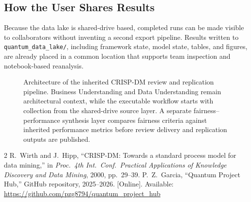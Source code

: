 \documentclass{IEEEtran}
\begin{document}
\subsection{How the User Shares Results}
Because the data lake is shared-drive based, completed runs can be made visible
to collaborators without inventing a second export pipeline. Results written to
\texttt{quantum\_data\_lake/}, including framework state, model state, tables,
and figures, are already placed in a common location that supports team
inspection and notebook-based reanalysis.

\clearpage
\begin{landscape}
\thispagestyle{plain}
\begin{figure}[p]
\centering
\resizebox{0.98\linewidth}{!}{}
\caption{Architecture of the inherited CRISP-DM review and replication pipeline.
Business Understanding and Data Understanding remain architectural context,
while the executable workflow starts with collection from the shared-drive
source layer. A separate fairness--performance synthesis layer compares
fairness criteria against inherited performance metrics before review delivery
and replication outputs are published.}
\label{fig:architecture}
\end{figure}
\end{landscape}

\begin{thebibliography}{2}
R.~Wirth and J.~Hipp,
``CRISP-DM: Towards a standard process model for data mining,''
in \textit{Proc.\ 4th Int.\ Conf.\ Practical Applications of Knowledge
Discovery and Data Mining}, 2000, pp.~29--39.
P.~Z.~Garcia,
``Quantum Project Hub,'' GitHub repository, 2025--2026.
[Online]. Available: \url{https://github.com/pzg8794/quantum_project_hub}
\end{thebibliography}
\end{document}
